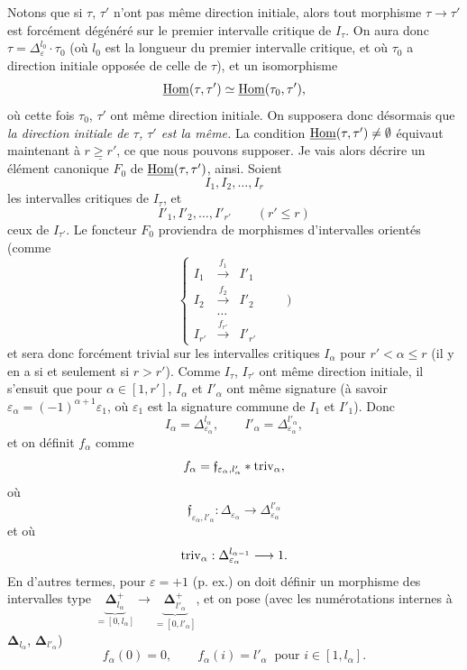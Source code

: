 Notons que si $\tau$, $\tau'$ n'ont pas même direction initiale, alors tout morphisme $\tau\longrightarrow\tau'$ est forcément dégénéré sur le premier intervalle critique de $I_\tau$. On aura donc $\tau=\Delta_\varepsilon^{l_0}\cdot\tau_0$ (où $l_0$ est la longueur du premier intervalle critique, et où $\tau_0$ a direction initiale opposée de celle de $\tau$), et un isomorphisme
\[
\underline{\mathrm{Hom}}(\tau,\tau')\simeq\underline{\mathrm{Hom}}(\tau_0,\tau'),
\]
où cette fois $\tau_0$, $\tau'$ ont même direction initiale. On supposera donc désormais que \textit{la direction initiale de $\tau$, $\tau'$ est la même.} La condition $\underline{\mathrm{Hom}}(\tau,\tau')\neq\emptyset$ équivaut maintenant à $\underline{r\geq r'}$, ce que nous pouvons supposer. Je vais alors décrire un élément canonique
$F_0$ de $\underline{\mathrm{Hom}}(\tau,\tau')$, ainsi. Soient
\[
I_1,I_2,\dots,I_r
\]
les intervalles critiques de $I_\tau$, et
\[
I'_1,I'_2,\dots,I'_{r'}\qquad(r'\leq r)
\]
ceux de $I_{\tau'}$. Le foncteur $F_0$ proviendra de morphismes d'intervalles orientés (comme
\[
\left\{
\begin{array}{ccc}
I_1 & \xrightarrow{f_1} & I'_1\\[4pt]
I_2 & \xrightarrow{f_2} & I'_2\\[4pt]
 & \dots & \\[4pt]
I_{r'} & \xrightarrow{f_{r'}} & I'_{r'}
\end{array}
\right.\qquad)
\]
et sera donc forcément trivial sur les intervalles critiques $I_\alpha$ pour $r'<\alpha\leq r$ (il y en a si et seulement si $r>r'$). Comme $I_\tau$, $I_{\tau'}$ ont même direction initiale, il s'ensuit que pour $\alpha\in[1,r']$, $I_\alpha$ et $I'_\alpha$ ont même signature (à savoir $\varepsilon_\alpha=(-1)^{\alpha+1}\varepsilon_1$, où $\varepsilon_1$ est la signature commune de $I_1$ et $I'_1$). Donc
\[
I_\alpha=\Delta^{l_\alpha}_{\varepsilon_\alpha},\qquad I'_\alpha=\Delta^{l'_\alpha}_{\varepsilon_\alpha},
\]
et on définit $f_\alpha$ comme
\[
f_\alpha=\mathfrak{f}_{\varepsilon_\alpha,l'_\alpha}*\mathrm{triv}_\alpha,
\]
où
\[
\mathfrak{f}_{\varepsilon_\alpha,l'_\alpha}:\Delta_{\varepsilon_\alpha}\longrightarrow\Delta^{l'_\alpha}_{\varepsilon_\alpha}
\]
et où
\[
\triv_\alpha:\Delta^{l_{\alpha-1}}_{\varepsilon_\alpha}\longrightarrow1. %
\]
En d'autres termes, pour $\varepsilon=+1$ (p. ex.) on doit définir un morphisme des intervalles type $\underbrace{\mathbf{\Delta}^+_{l_\alpha}}_{=[0,l_\alpha]}\longrightarrow\underbrace{\mathbf{\Delta}^+_{l'_\alpha}}_{=[0,l'_\alpha]}$, et on pose (avec les numérotations internes à $\mathbf{\Delta}_{l_\alpha}$, $\mathbf{\Delta}_{l'_\alpha}$)
\[
f_\alpha(0)=0,\qquad f_\alpha(i)=l'_\alpha\ \text{ pour }i\in[1,l_\alpha].
\]

